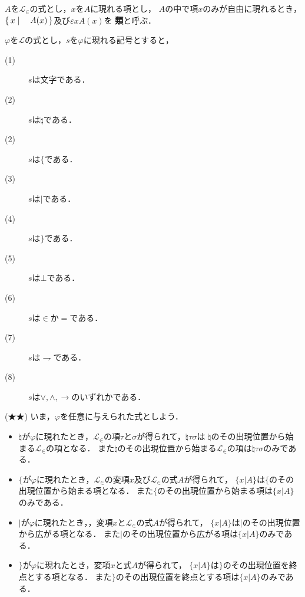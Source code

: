 	\begin{screen}
		\begin{dfn}[類]
			$A$を$\mathcal{L}_{\in}$の式とし，$x$を$A$に現れる項とし，
			$A$の中で項$x$のみが自由に現れるとき，
			$\left\{\, x \mid \quad A(x)\, \right\}$及び$\varepsilon x A(x)$を
			{\bf 類}と呼ぶ．
		\end{dfn}
	\end{screen}
	
	$\varphi$を$\mathcal{L}$の式とし，$s$を$\varphi$に現れる記号とすると，
	\begin{description}
		\item[(1)] $s$は文字である．
		\item[(2)] $s$は$\natural$である．
		\item[(2)] $s$は$\{$である．
		\item[(3)] $s$は$|$である．
		\item[(4)] $s$は$\}$である．
		\item[(5)] $s$は$\bot$である．
		\item[(6)] $s$は$\in$か$=$である．
		\item[(7)] $s$は$\rightharpoondown$である．
		\item[(8)] $s$は$\vee,\wedge,\rightarrow$のいずれかである．
	\end{description}
	
	\begin{screen}
		(★★) いま，$\varphi$を任意に与えられた式としよう．
		\begin{itemize}
			\item $\natural$が$\varphi$に現れたとき，$\mathcal{L}_{\in}$の項$\tau$と$\sigma$が得られて，$\natural \tau \sigma$は
				$\natural$のその出現位置から始まる$\mathcal{L}_{\in}$の項となる．
				また$\natural$のその出現位置から始まる$\mathcal{L}_{\in}$の項は$\natural \tau \sigma$のみである．
				
			\item $\{$が$\varphi$に現れたとき，$\mathcal{L}_{\in}$の変項$x$及び$\mathcal{L}_{\in}$の式$A$が得られて，
				$\{ x|A\}$は$\{$のその出現位置から始まる項となる．
				また$\{$のその出現位置から始まる項は$\{x|A\}$のみである．
				
			\item $|$が$\varphi$に現れたとき，，変項$x$と$\mathcal{L}_{\in}$の式$A$が得られて，
				$\{x|A\}$は$|$のその出現位置から広がる項となる．
				また$|$のその出現位置から広がる項は$\{x|A\}$のみである．
				
			\item $\}$が$\varphi$に現れたとき，変項$x$と式$A$が得られて，
				$\{x|A\}$は$\}$のその出現位置を終点とする項となる．
				また$\}$のその出現位置を終点とする項は$\{x|A\}$のみである．
		\end{itemize}
	\end{screen}
	
